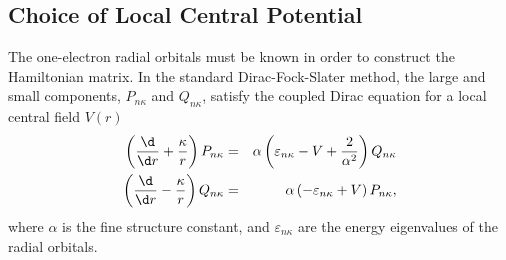 \documentclass{elsart}
\begin{document}
\subsection{Choice of Local Central Potential}
The one-electron radial orbitals must be known in order to construct the
Hamiltonian matrix. In the standard Dirac-Fock-Slater method, the large and
small components, $P_{n\kappa}$ and $Q_{n\kappa}$, satisfy the coupled Dirac
equation for a local central field $V(r)$
\begin{eqnarray}
\label{eq_dirac}
\left(\frac{\d}{\d r} + \frac{\kappa}{r}\right)P_{n\kappa} &=&
\alpha\left(\varepsilon_{n\kappa} - V + \frac{2}{\alpha^2}\right)Q_{n\kappa}
\nonumber\\
\left(\frac{\d}{\d r} - \frac{\kappa}{r}\right)Q_{n\kappa} &=&
\alpha\left(-\varepsilon_{n\kappa} + V\right)P_{n\kappa},
\end{eqnarray}
where $\alpha$ is the fine structure constant, and $\varepsilon_{n\kappa}$ are
the energy eigenvalues of the radial orbitals.
\end{document}
